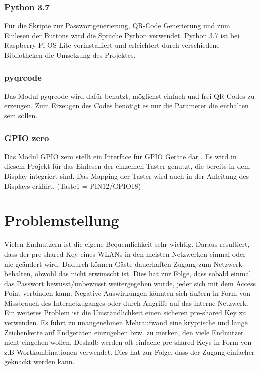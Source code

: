 \documentclass[a4paper,11pt,singlespacing]{article}
\begin{document}
    		\subsubsection{Python 3.7}
    			Für die Skripte zur Passwortgenerierung, QR-Code Generierung und zum Einlesen der Buttons wird die Sprache Python verwendet. Python 3.7 ist bei Raspberry Pi OS Lite  vorinstalliert und erleichtert durch verschiedene Bibliotheken die Umsetzung des Projektes.
    			\subsubsection{pyqrcode}
    				Das Modul pyqrcode wird dafür benutzt, möglichst einfach und frei QR-Codes zu erzeugen. Zum Erzeugen des Codes benötigt es nur die Parameter die enthalten sein sollen. \cite{Quote_pyqrcode}
    			\subsubsection{GPIO zero}
    				Das Modul GPIO zero stellt ein Interface für GPIO Geräte dar \cite{Quote_gpio_zero}. Es wird in diesem Projekt für das Einlesen der einzelnen Taster genutzt, die bereits in dem Display integriert sind. Das Mapping der Taster wird auch in der Anleitung des Displays erklärt. (Taste1 = PIN12/GPIO18) \cite{Quote_gpio_zero}
    	
    	
    \section{Problemstellung}
    	Vielen Endnutzern ist die eigene Bequemlichkeit sehr wichtig. Daraus resultiert, dass der pre-shared Key eines WLANs in den meisten Netzwerken einmal oder nie geändert wird. Dadurch können Gäste dauerhaften Zugang zum Netzwerk behalten, obwohl das nicht erwünscht ist. Dies hat zur Folge, dass sobald einmal das Passwort bewusst/unbewusst weitergegeben wurde, jeder sich mit dem Access Point verbinden kann. Negative Auswirkungen könnten sich äußern in Form von Missbrauch des Internetzuganges oder durch Angriffe auf das interne Netzwerk.\\
    	Ein weiteres Problem ist die Umständlichkeit einen sicheren pre-shared Key zu verwenden. Es führt zu unangenehmen Mehraufwand eine kryptische und lange Zeichenkette auf Endgeräten einzugeben bzw. zu merken, den viele Endnutzer nicht eingehen wollen. Deshalb werden oft einfache pre-shared Keys in Form von z.B Wortkombinationen verwendet. Dies hat zur Folge, dass der Zugang einfacher geknackt werden kann.
    	
\end{document}
